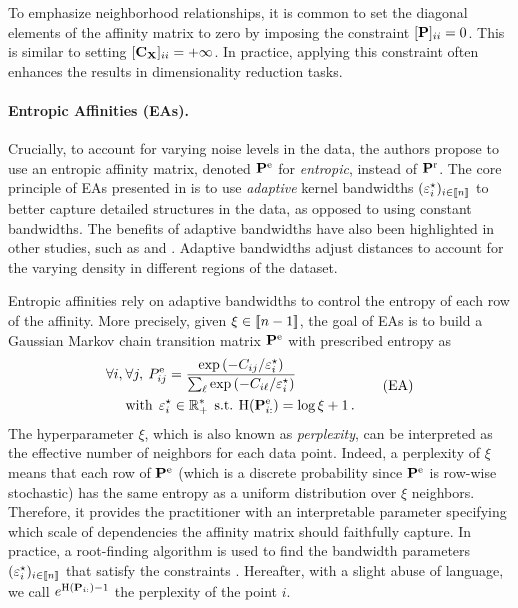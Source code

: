 \begin{remark}
    To emphasize neighborhood relationships, it is common to set the diagonal elements of the affinity matrix to zero by imposing the constraint $[{\mathbf{P}}]_{ii} = 0$. This is similar to setting $[{\mathbf{C}}_{{\mathbf{X}}}]_{ii} = +\infty$. In practice, applying this constraint often enhances the results in dimensionality reduction tasks.
\end{remark}

\paragraph{Entropic Affinities (EAs).}
Crucially, to account for varying noise levels in the data, the authors propose to use an entropic affinity matrix, denoted ${\mathbf{P}}^{\mathrm{e}}$ for \emph{entropic}, instead of ${\mathbf{P}}^{\mathrm{r}}$. The core principle of EAs presented in \citep{hinton2002stochastic} is to use \emph{adaptive} kernel bandwidths $(\varepsilon^\star_i)_{i \in {[\![n]\!]}}$ to better capture detailed structures in the data, as opposed to using constant bandwidths. The benefits of adaptive bandwidths have also been highlighted in other studies, such as \citep{van2018recovering} and \citep{zelnik2004self}. Adaptive bandwidths adjust distances to account for the varying density in different regions of the dataset.

Entropic affinities rely on adaptive bandwidths to control the entropy of each row of the affinity. More precisely, given $\xi \in {[\![n-1]\!]}$, the goal of EAs is to build a Gaussian Markov chain transition matrix ${\mathbf{P}}^{\mathrm{e}}$ with prescribed entropy as
\begin{equation}
\begin{split}
    \forall i, \: &\forall j, \: P^{\mathrm{e}}_{ij} = \frac{\exp{(-C_{ij}/\varepsilon^\star_i)}}{\sum_\ell \exp{(-C_{i\ell}/\varepsilon^\star_i)}} \\
    &\text{with} \:\: \varepsilon^\star_i \in \mathbb{R}^*_+ \:\: \text{s.t.} \: \operatorname{H}({\mathbf{P}}^{\mathrm{e}}_{i:}) = \log{\xi} + 1\,. \label{eq:entropic_affinity_pb}
\end{split}\tag{EA}
\end{equation}
The hyperparameter $\xi$, which is also known as \emph{perplexity}, can be interpreted as the effective number of neighbors for each data point. Indeed, a perplexity of $\xi$ means that each row of ${\mathbf{P}}^{\mathrm{e}}$ (which is a discrete probability since ${\mathbf{P}}^{\mathrm{e}}$ is row-wise stochastic) has the same entropy as a uniform distribution over $\xi$ neighbors. Therefore, it provides the practitioner with an interpretable parameter specifying which scale of dependencies the affinity matrix should faithfully capture. In practice, a root-finding algorithm is used to find the bandwidth parameters $(\varepsilon_i^\star)_{i \in {[\![n]\!]}}$ that satisfy the constraints \citep{vladymyrov2013entropic}. Hereafter, with a slight abuse of language, we call $e^{\operatorname{H}({\mathbf{P}}_{i:})-1}$ the perplexity of the point $i$.

